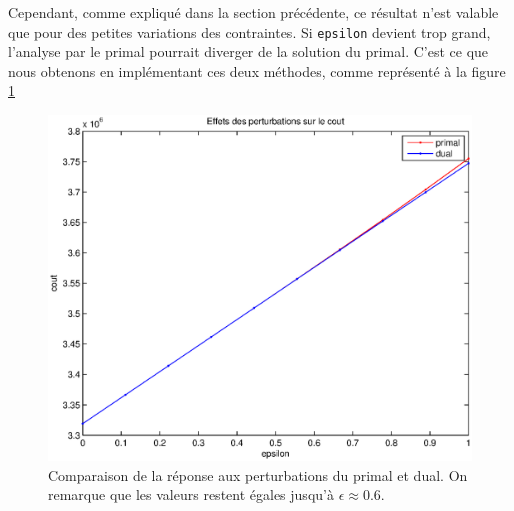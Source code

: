 \documentclass[12pt,oneside,a4paper]{article}
\begin{document}
Cependant, comme expliqué dans la section précédente, ce résultat n'est valable que pour des petites variations des contraintes.
Si \texttt{epsilon} devient trop grand, l'analyse par le primal pourrait diverger de la solution du primal.
C'est ce que nous obtenons en implémentant ces deux méthodes, comme représenté à la figure \ref{fig:responseToPerturbations}

\begin{figure}
  \begin{center}
    \includegraphics[scale=0.6]{img/responseToPerturbations.eps}
    \caption{Comparaison de la réponse aux perturbations du primal 
    et dual. On remarque que les valeurs restent égales jusqu'à 
    $\epsilon \approx 0.6$.}
    \label{fig:responseToPerturbations}
  \end{center}
\end{figure}
\end{document}

